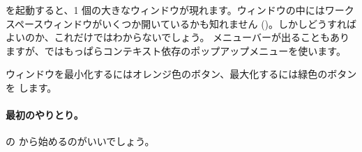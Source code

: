 \documentclass[a4paper,10pt,twoside]{book}
\begin{document}
\pharo を起動すると、1 個の大きなウィンドウが現れます。ウィンドウの中にはワークスペースウィンドウがいくつか開いているかも知れません ()。しかしどうすればよいのか、これだけではわからないでしょう。
メニューバーが出ることもありますが、\pharo ではもっぱらコンテキスト依存のポップアップメニューを使います。


ウィンドウを最小化するにはオレンジ色のボタン、最大化するには緑色のボタンを \click します。

\paragraph{最初のやりとり。}

 の から始めるのがいいでしょう。


\end{document}
